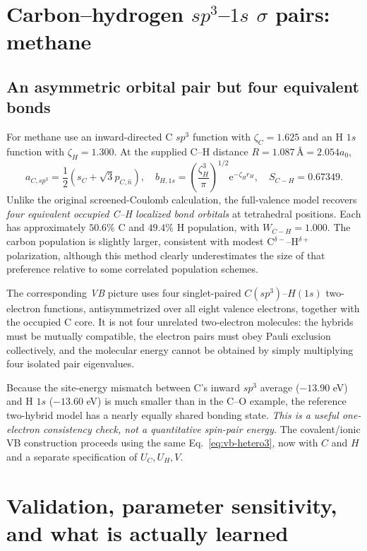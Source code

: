 \documentclass[11pt,letterpaper]{article}
\newcommand{\e}{\mathrm e}
\begin{document}
\section{Carbon--hydrogen $sp^3$--$1s$ $\sigma$ pairs: methane}
\subsection{An asymmetric orbital pair but four equivalent bonds}
For methane use an inward-directed C $sp^3$ function with $\zeta_C=1.625$ and an H $1s$ function with $\zeta_H=1.300$. At the supplied C--H distance $R=1.087\,\text{\AA}=2.054a_0$,
\begin{equation}\label{eq:ch-new}
\boxed{a_{C,sp^3}=\frac12(s_C+\sqrt3 p_{C,\hat n}),\quad
b_{H,1s}=\left(\frac{\zeta_H^3}{\pi}\right)^{1/2}\e^{-\zeta_Hr_H},\quad S_{C-H}=0.67349.}
\end{equation}
Unlike the original screened-Coulomb calculation, the full-valence model recovers \emph{four equivalent occupied C--H localized bond orbitals} at tetrahedral positions. Each has approximately $50.6\%$ C and $49.4\%$ H population, with $W_{C-H}=1.000$. The carbon population is slightly larger, consistent with modest C$^{\delta-}$--H$^{\delta+}$ polarization, although this method clearly underestimates the size of that preference relative to some correlated population schemes.

The corresponding \emph{VB} picture uses four singlet-paired $C(sp^3)$--$H(1s)$ two-electron functions, antisymmetrized over all eight valence electrons, together with the occupied C core. It is not four unrelated two-electron molecules: the hybrids must be mutually compatible, the electron pairs must obey Pauli exclusion collectively, and the molecular energy cannot be obtained by simply multiplying four isolated pair eigenvalues.

Because the site-energy mismatch between C's inward $sp^3$ average ($-13.90$ eV) and H $1s$ ($-13.60$ eV) is much smaller than in the C--O example, the reference two-hybrid model has a nearly equally shared bonding state. \emph{This is a useful one-electron consistency check, not a quantitative spin-pair energy.} The covalent/ionic VB construction proceeds using the same Eq.~\eqref{eq:vb-hetero3}, now with $C$ and $H$ and a separate specification of $U_C,U_H,V$.
\FloatBarrier

\section{Validation, parameter sensitivity, and what is actually learned}
\end{document}
